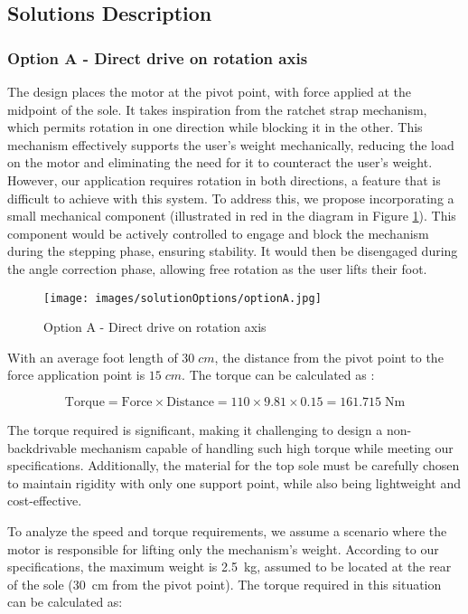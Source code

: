 \documentclass[lettersize,journal]{IEEEtran}
\begin{document}
\subsection{Solutions Description}

\subsubsection{Option A - Direct drive on rotation axis }

The design places the motor at the pivot point, with force applied at the midpoint of the sole. It takes inspiration from the ratchet strap mechanism, which permits rotation in one direction while blocking it in the other. This mechanism effectively supports the user's weight mechanically, reducing the load on the motor and eliminating the need for it to counteract the user's weight. However, our application requires rotation in both directions, a feature that is difficult to achieve with this system. To address this, we propose incorporating a small mechanical component (illustrated in red in the diagram in Figure \ref{optionA}). This component would be actively controlled to engage and block the mechanism during the stepping phase, ensuring stability. It would then be disengaged during the angle correction phase, allowing free rotation as the user lifts their foot.

\begin{figure}[!ht]
\centering
\texttt{[image: images/solutionOptions/optionA.jpg]}
\caption{Option A - Direct drive on rotation axis}
\label{optionA}
\end{figure}

With an average foot length of $30 \;cm$, the distance from the pivot point to the force application point is $15 \;cm$. The torque can be calculated as :

\begin{equation*}
\text{Torque} = \text{Force} \times \text{Distance} = 110 \times 9.81 \times 0.15 = 161.715 \; \text{Nm}
\end{equation*}

The torque required is significant, making it challenging to design a non-backdrivable mechanism capable of handling such high torque while meeting our specifications. Additionally, the material for the top sole must be carefully chosen to maintain rigidity with only one support point, while also being lightweight and cost-effective.

To analyze the speed and torque requirements, we assume a scenario where the motor is responsible for lifting only the mechanism’s weight. According to our specifications, the maximum weight is 2.5~kg, assumed to be located at the rear of the sole (30~cm from the pivot point). The torque required in this situation can be calculated as:  
\end{document}
